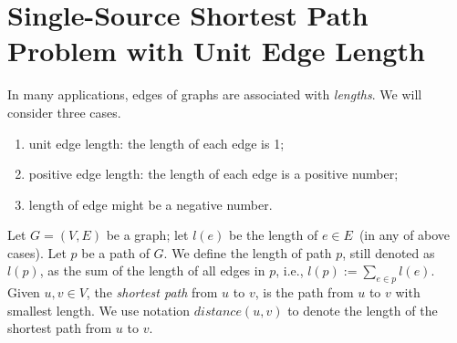 \section*{Single-Source Shortest Path Problem with Unit Edge Length}

In many applications, edges of graphs are associated with \emph{lengths}.
We will consider three cases.
\vspace*{-\topsep}
\begin{enumerate}
\item unit edge length: the length of each edge is 1;
\item positive edge length: the length of each edge is a positive number;
\item length of edge might be a negative number.
\end{enumerate}

Let $G = (V, E)$ be a graph; let $l(e)$ be the length of $e\in E$~(in any of above cases).
Let $p$ be a path of $G$. We define the length of path $p$, still denoted as $l(p)$,
as the sum of the length of all edges in $p$, i.e., $l(p) := \sum_{e\in p} l(e)$.
Given $u,v\in V$, the \emph{shortest path} from $u$ to $v$, is the path from $u$ to $v$
with smallest length. We use notation $distance(u,v)$ to denote the length
of the shortest path from $u$ to $v$.


